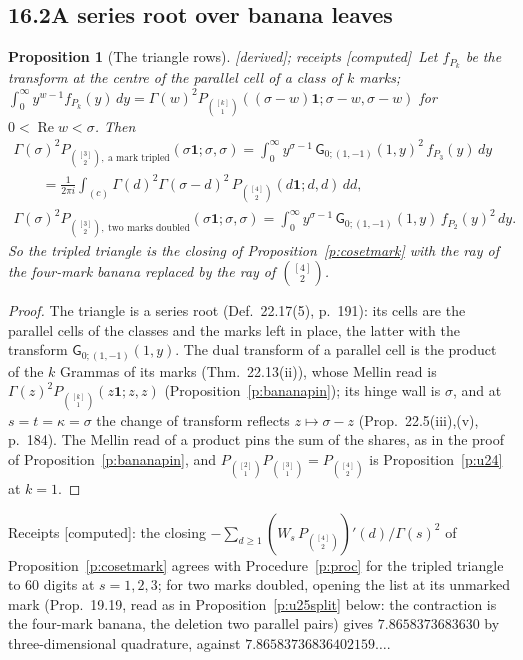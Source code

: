 \documentclass[11pt]{article}
\newcommand{\one}{\mathbf 1}
\newcommand{\sG}{\mathsf G}
\DeclareMathOperator{\re}{Re}
\theoremstyle{plain}
\newtheorem{proposition}{Proposition}[section]
\theoremstyle{definition}
\theoremstyle{remark}
\newcommand{\derived}{\textup{[derived]}}
\newcommand{\computed}{\textup{[computed]}}
\begin{document}
\subsection*{16.2\quad A series root over banana leaves}

\begin{proposition}[The triangle rows]\label{p:triangles}\derived; receipts \computed\
Let $f_{P_k}$ be the transform at the centre of the parallel cell of a class of $k$ marks; $\int_0^\infty y^{w-1}f_{P_k}(y)\,dy=\Gamma(w)^2P_{\binom{[k]}1}((\sigma-w)\one;\sigma-w,\sigma-w)$ for $0<\re w<\sigma$. Then
\begin{gather*}
\Gamma(\sigma)^2P_{\binom{[3]}2,\ \text{a mark tripled}}(\sigma\one;\sigma,\sigma)=\int_0^\infty y^{\sigma-1}\,\sG_{0;(1,-1)}(1,y)^2\,f_{P_3}(y)\,dy\\
\qquad=\frac1{2\pi i}\int_{(c)}\Gamma(d)^2\Gamma(\sigma-d)^2\,P_{\binom{[4]}2}(d\one;d,d)\,dd,\\
\Gamma(\sigma)^2P_{\binom{[3]}2,\ \text{two marks doubled}}(\sigma\one;\sigma,\sigma)=\int_0^\infty y^{\sigma-1}\,\sG_{0;(1,-1)}(1,y)\,f_{P_2}(y)^2\,dy .
\end{gather*}
So the tripled triangle is the closing of Proposition~\ref{p:cosetmark} with the ray of the four-mark banana replaced by the ray of $\binom{[4]}2$.
\end{proposition}

\begin{proof}
The triangle is a series root (Def.~22.17(5), p.~191): its cells are the parallel cells of the classes and the marks left in place, the latter with the transform $\sG_{0;(1,-1)}(1,y)$. The dual transform of a parallel cell is the product of the $k$ Grammas of its marks (Thm.~22.13(ii)), whose Mellin read is $\Gamma(z)^2P_{\binom{[k]}1}(z\one;z,z)$ (Proposition~\ref{p:bananapin}); its hinge wall is $\sigma$, and at $s=t=\kappa=\sigma$ the change of transform reflects $z\mapsto\sigma-z$ (Prop.~22.5(iii),(v), p.~184). The Mellin read of a product pins the sum of the shares, as in the proof of Proposition~\ref{p:bananapin}, and $P_{\binom{[2]}1}P_{\binom{[3]}1}=P_{\binom{[4]}2}$ is Proposition~\ref{p:u24} at $k=1$.
\end{proof}

\noindent Receipts \computed: the closing $-\sum_{d\ge1}(W_s\,P_{\binom{[4]}2})'(d)/\Gamma(s)^2$ of Proposition~\ref{p:cosetmark} agrees with Procedure~\ref{p:proc} for the tripled triangle to $60$ digits at $s=1,2,3$; for two marks doubled, opening the list at its unmarked mark (Prop.~19.19, read as in Proposition~\ref{p:u25split} below: the contraction is the four-mark banana, the deletion two parallel pairs) gives $7.8658373683630$ by three-dimensional quadrature, against $7.86583736836402159\ldots$.
\end{document}
